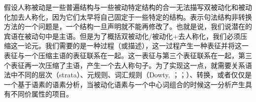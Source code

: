 假设人称被动是一些普遍结构与一些被动特定结构的合一无法描写双被动化和被动化加去人称化，因为它们太早将自己固定于一些特定的结构。表示句法结构非转换方法的一个问题是，一个结构一旦声明就不能再修改了。也就是说，我们说潜在的宾语在被动句中是主语。但是为了概括双被动化/被动化+去人称化，我们必须压缩这一论元。我们需要的是一种过程（或描述），这一过程产生一种表征并将这一表征与一个压缩主语的表征联系在一起。这一表征与第三个表征联系在一起，第三个表征再一次压缩了主语，产生一个去人称句子。为了实现这一点，就需要关系语法\citep{Timberlake82a,Ozkaragoez86a}中不同的层次（strata）、元规则\citep*{GKPS85a}、词汇规则（Dowty, \citeyear[]{Dowty78a}；\citeyear[\S~3.4]{Dowty2003a}；\citealt{Bresnan82a,ps,Blevins2003a,Mueller2003e}）、转换\citep{Chomsky57a}，或者仅仅是一个基于语素的语素分析，当被动化语素与一个中心词组合的时候这一分析产生具有不同价属性的项目\citep{Chomsky81a}。

